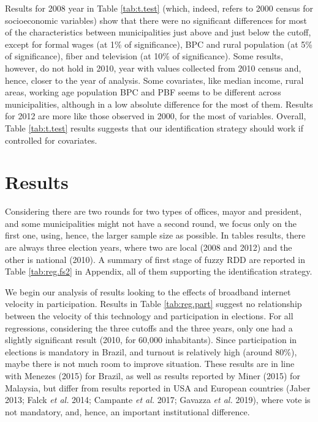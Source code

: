 \documentclass[
  12pt,
]{article}
\begin{document}
Results for 2008 year in Table \ref{tab:t.test} (which, indeed, refers
to 2000 census for socioeconomic variables) show that there were no
significant differences for most of the characteristics between
municipalities just above and just below the cutoff, except for formal
wages (at 1\% of significance), BPC and rural population (at 5\% of
significance), fiber and television (at 10\% of significance). Some
results, however, do not hold in 2010, year with values collected from
2010 census and, hence, closer to the year of analysis. Some covariates,
like median income, rural areas, working age population BPC and PBF
seems to be different across municipalities, although in a low absolute
difference for the most of them. Results for 2012 are more like those
observed in 2000, for the most of variables. Overall, Table
\ref{tab:t.test} results suggests that our identification strategy
should work if controlled for covariates.

\hypertarget{results}{%
\section{Results}\label{results}}

Considering there are two rounds for two types of offices, mayor and
president, and some municipalities might not have a second round, we
focus only on the first one, using, hence, the larger sample size as
possible. In tables results, there are always three election years,
where two are local (2008 and 2012) and the other is national (2010). A
summary of first stage of fuzzy RDD are reported in Table
\ref{tab:reg.fs2} in Appendix, all of them supporting the identification
strategy.

We begin our analysis of results looking to the effects of broadband
internet velocity in participation. Results in Table \ref{tab:reg.part}
suggest no relationship between the velocity of this technology and
participation in elections. For all regressions, considering the three
cutoffs and the three years, only one had a slightly significant result
(2010, for 60,000 inhabitants). Since participation in elections is
mandatory in Brazil, and turnout is relatively high (around 80\%), maybe
there is not much room to improve situation. These results are in line
with Menezes (2015) for Brazil, as well as results reported by Miner
(2015) for Malaysia, but differ from results reported in USA and
European countries (Jaber 2013; Falck \emph{et al.} 2014; Campante
\emph{et al.} 2017; Gavazza \emph{et al.} 2019), where vote is not
mandatory, and, hence, an important institutional difference.
\end{document}
